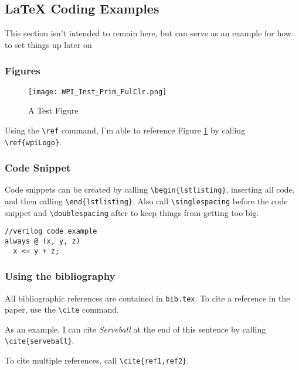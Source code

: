 \subsection{LaTeX Coding Examples}
This section isn't intended to remain here, but can serve as an example for how to set things up later on

\subsubsection{Figures} 
\begin{figure}[H]
	\centerline{\texttt{[image: WPI\_Inst\_Prim\_FulClr.png]}}
	\caption{A Test Figure}
	\label{wpiLogo}
\end{figure}

Using the \verb!\ref! command, I'm able to reference Figure \ref{wpiLogo} by calling \verb!\ref{wpiLogo}!.

\subsubsection{Code Snippet}
Code snippets can be created by calling \verb!\begin{lstlisting}!, inserting all code, and then calling \verb!\end{lstlisting}!. Also call \verb!\singlespacing! before the code snippet and \verb!\doublespacing! after to keep things from getting too big.
\singlespacing %
\begin{lstlisting}
//verilog code example
always @ (x, y, z)
  x <= y + z;
\end{lstlisting}
\doublespacing %

\subsubsection{Using the bibliography}
All bibliographic references are contained in \texttt{bib.tex}. To cite a reference in the paper, use the \verb!\cite! command.
\par
As an example, I can cite \textit{Serveball} at the end of this sentence by calling \verb!\cite{serveball}!.\cite{serveball}
\par
To cite multiple references, call \verb!\cite{ref1,ref2}!.\cite{serveball,porikli}
